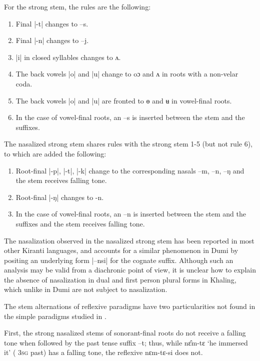 \documentclass[twoside,a4paper,11pt]{article}
\newcommand{\ipa}[1]{{\phon#1}}
\begin{document}
For the strong stem, the rules are the following:

\begin{enumerate}
\item Final  |\ipa{-t}|  changes to --\ipa{s}.
\item Final  |\ipa{-n}|  changes to --\ipa{j}.
\item |\ipa{i}| in closed syllables changes to \ipa{ʌ}.
\item The back vowels  |\ipa{o}|  and |\ipa{u}|  change  to \ipa{oɔ} and \ipa{ʌ} in roots with a non-velar coda.
\item The back vowels |\ipa{o}| and |\ipa{u}| are fronted to \ipa{ɵ} and \ipa{ʉ} in vowel-final roots.
\item In the case of vowel-final roots, an --\ipa{s} is inserted between the stem and the suffixes.
\end{enumerate}
The nasalized strong stem shares  rules with the strong stem 1-5 (but not rule 6), to which are added the following:
\begin{enumerate}
\item Root-final  |\ipa{-p}|, |\ipa{-t}|, |\ipa{-k}| change to the corresponding nasals \ipa{--m}, \ipa{--n}, \ipa{--ŋ} and the stem receives falling tone.
\item Root-final |\ipa{-ŋ}| changes to \ipa{-n}.
\item In the case of vowel-final roots, an --\ipa{n} is inserted between the stem and the suffixes and the stem receives falling tone.
\end{enumerate}
The nasalization observed in the nasalized strong stem has been reported in most other Kiranti languages, and \citet[127]{driem93dumi} accounts for a similar phenomenon in Dumi by positing an underlying form |\ipa{--nsi}| for the cognate suffix. Although such an analysis may be valid from a diachronic point of view, it is unclear how to explain the absence of nasalization in dual and first person plural forms in Khaling, which unlike in Dumi are not subject to nasalization.

The stem alternations of reflexive paradigms have two particularities not found in the simple paradigms studied in \citet{jacques12khaling}. 

First, the strong nasalized stems of sonorant-final roots do  not receive a falling tone when followed by the past tense suffix --\ipa{t}; thus, while \ipa{nɛ̂m-tɛ} `he immersed it' ( \textsc{3sg} past) has a falling tone, the reflexive \ipa{nɛm-tɛ-si} does not.
\end{document}
